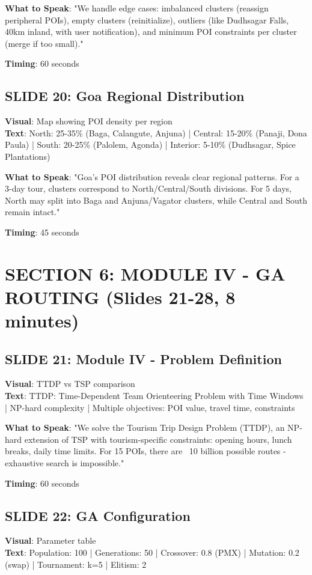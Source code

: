 \documentclass[12pt]{article}
\begin{document}
\textbf{What to Speak}:
"We handle edge cases: imbalanced clusters (reassign peripheral POIs), empty clusters (reinitialize), outliers (like Dudhsagar Falls, 40km inland, with user notification), and minimum POI constraints per cluster (merge if too small)."

\textbf{Timing}: 60 seconds

\subsection{SLIDE 20: Goa Regional Distribution}
\textbf{Visual}: Map showing POI density per region \\
\textbf{Text}: North: 25-35\% (Baga, Calangute, Anjuna) | Central: 15-20\% (Panaji, Dona Paula) | South: 20-25\% (Palolem, Agonda) | Interior: 5-10\% (Dudhsagar, Spice Plantations)

\textbf{What to Speak}:
"Goa's POI distribution reveals clear regional patterns. For a 3-day tour, clusters correspond to North/Central/South divisions. For 5 days, North may split into Baga and Anjuna/Vagator clusters, while Central and South remain intact."

\textbf{Timing}: 45 seconds

\section{SECTION 6: MODULE IV - GA ROUTING (Slides 21-28, 8 minutes)}

\subsection{SLIDE 21: Module IV - Problem Definition}
\textbf{Visual}: TTDP vs TSP comparison \\
\textbf{Text}: TTDP: Time-Dependent Team Orienteering Problem with Time Windows | NP-hard complexity | Multiple objectives: POI value, travel time, constraints

\textbf{What to Speak}:
"We solve the Tourism Trip Design Problem (TTDP), an NP-hard extension of TSP with tourism-specific constraints: opening hours, lunch breaks, daily time limits. For 15 POIs, there are ~10 billion possible routes - exhaustive search is impossible."

\textbf{Timing}: 60 seconds

\subsection{SLIDE 22: GA Configuration}
\textbf{Visual}: Parameter table \\
\textbf{Text}: Population: 100 | Generations: 50 | Crossover: 0.8 (PMX) | Mutation: 0.2 (swap) | Tournament: k=5 | Elitism: 2
\end{document}
